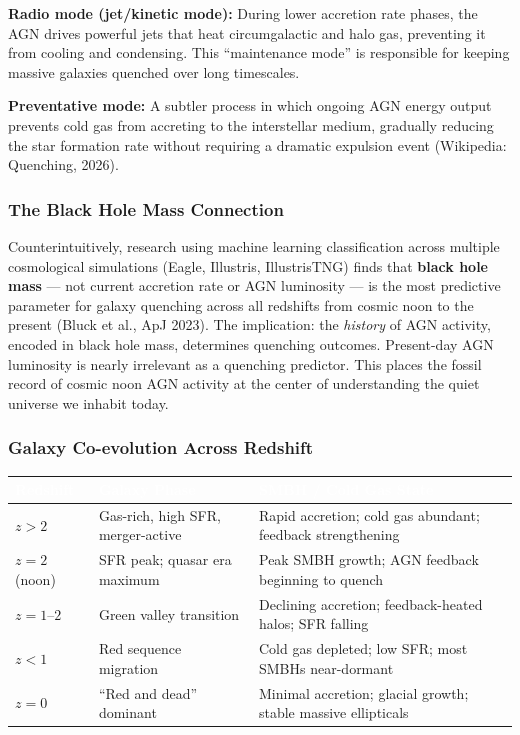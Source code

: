 \documentclass[11pt,letterpaper]{article}
\newcommand{\tableheader}[1]{\textbf{\sffamily\textcolor{white}{#1}}}
\begin{document}
\textbf{Radio mode (jet/kinetic mode):} During lower accretion rate phases, the AGN drives powerful jets that heat circumgalactic and halo gas, preventing it from cooling and condensing. This ``maintenance mode'' is responsible for keeping massive galaxies quenched over long timescales.

\textbf{Preventative mode:} A subtler process in which ongoing AGN energy output prevents cold gas from accreting to the interstellar medium, gradually reducing the star formation rate without requiring a dramatic expulsion event (Wikipedia: Quenching, 2026).

\subsubsection{The Black Hole Mass Connection}

Counterintuitively, research using machine learning classification across multiple cosmological simulations (Eagle, Illustris, IllustrisTNG) finds that \textbf{black hole mass} --- not current accretion rate or AGN luminosity --- is the most predictive parameter for galaxy quenching across all redshifts from cosmic noon to the present (Bluck et al., ApJ 2023). The implication: the \emph{history} of AGN activity, encoded in black hole mass, determines quenching outcomes. Present-day AGN luminosity is nearly irrelevant as a quenching predictor. This places the fossil record of cosmic noon AGN activity at the center of understanding the quiet universe we inhabit today.

\subsubsection{Galaxy Co-evolution Across Redshift}

\begin{center}
\begin{tabularx}{\textwidth}{C{2cm}L{4cm}X}
\toprule
{}
\tableheader{Redshift} & \tableheader{Galaxy Phase} & \tableheader{SMBH / Cold Gas State} \\
\midrule
$z > 2$ & Gas-rich, high SFR, merger-active & Rapid accretion; cold gas abundant; feedback strengthening \\
$z = 2$ (noon) & SFR peak; quasar era maximum & Peak SMBH growth; AGN feedback beginning to quench \\
$z = 1$--$2$ & Green valley transition & Declining accretion; feedback-heated halos; SFR falling \\
$z < 1$ & Red sequence migration & Cold gas depleted; low SFR; most SMBHs near-dormant \\
$z = 0$ & ``Red and dead'' dominant & Minimal accretion; glacial growth; stable massive ellipticals \\
\bottomrule
\end{tabularx}
\end{center}
\end{document}
